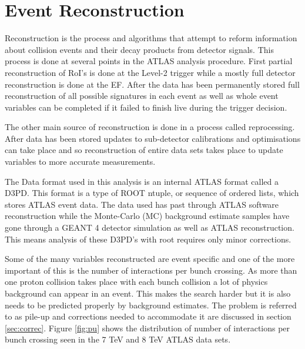 \chapter{Event Reconstruction}

Reconstruction is the process and algorithms that attempt to reform information about collision events and their decay products from detector signals. This process is done at several points in the ATLAS analysis procedure. First partial reconstruction of RoI's is done at the Level-2 trigger while a mostly full detector reconstruction is done at the EF. After the data has been permanently stored full reconstruction of all possible signatures in each event as well as whole event variables can be completed if it failed to finish live during the trigger decision.

The other main source of reconstruction is done in a process called reprocessing. After data has been stored updates to sub-detector calibrations and optimisations can take place and so reconstruction of entire data sets takes place to update variables to more accurate measurements. 

The Data format used in this analysis is an internal ATLAS format called a D3PD. This format is a type of ROOT \cite{Antcheva20092499} ntuple, or sequence of ordered lists, which stores ATLAS event data. The data used has past through ATLAS software reconstruction while the Monte-Carlo (MC) background estimate samples have gone through a GEANT 4 \cite{Agostinelli2003250} detector simulation as well as ATLAS reconstruction. This means analysis of these D3PD's with root requires only minor corrections.


Some of the many variables reconstructed are event specific and one of the more important of this is the number of interactions per bunch crossing. As more than one proton collision takes place with each bunch collision a lot of physics background can appear in an event. This makes the search harder but it is also needs to be predicted properly by background estimates. The problem is referred to as pile-up and corrections needed to accommodate it are discussed in section \ref{sec:correc}. Figure \ref{fig:pu} shows the distribution of number of interactions per bunch crossing seen in the 7 TeV and 8 TeV ATLAS data sets.

